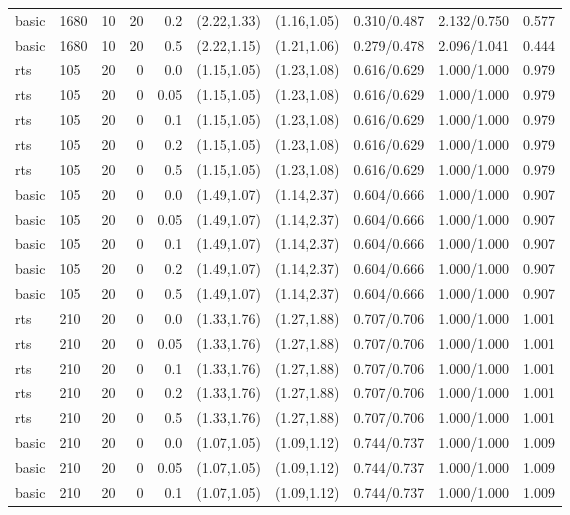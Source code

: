 \begin{tabular}{llrrrccccc}
basic & 1680 & 10 & 20 & 0.2 & (2.22,1.33) & (1.16,1.05) & 0.310/0.487 & 2.132/0.750 & 0.577 \\
basic & 1680 & 10 & 20 & 0.5 & (2.22,1.15) & (1.21,1.06) & 0.279/0.478 & 2.096/1.041 & 0.444 \\
rts & 105 & 20 & 0 & 0.0 & (1.15,1.05) & (1.23,1.08) & 0.616/0.629 & 1.000/1.000 & 0.979 \\
rts & 105 & 20 & 0 & 0.05 & (1.15,1.05) & (1.23,1.08) & 0.616/0.629 & 1.000/1.000 & 0.979 \\
rts & 105 & 20 & 0 & 0.1 & (1.15,1.05) & (1.23,1.08) & 0.616/0.629 & 1.000/1.000 & 0.979 \\
rts & 105 & 20 & 0 & 0.2 & (1.15,1.05) & (1.23,1.08) & 0.616/0.629 & 1.000/1.000 & 0.979 \\
rts & 105 & 20 & 0 & 0.5 & (1.15,1.05) & (1.23,1.08) & 0.616/0.629 & 1.000/1.000 & 0.979 \\
basic & 105 & 20 & 0 & 0.0 & (1.49,1.07) & (1.14,2.37) & 0.604/0.666 & 1.000/1.000 & 0.907 \\
basic & 105 & 20 & 0 & 0.05 & (1.49,1.07) & (1.14,2.37) & 0.604/0.666 & 1.000/1.000 & 0.907 \\
basic & 105 & 20 & 0 & 0.1 & (1.49,1.07) & (1.14,2.37) & 0.604/0.666 & 1.000/1.000 & 0.907 \\
basic & 105 & 20 & 0 & 0.2 & (1.49,1.07) & (1.14,2.37) & 0.604/0.666 & 1.000/1.000 & 0.907 \\
basic & 105 & 20 & 0 & 0.5 & (1.49,1.07) & (1.14,2.37) & 0.604/0.666 & 1.000/1.000 & 0.907 \\
rts & 210 & 20 & 0 & 0.0 & (1.33,1.76) & (1.27,1.88) & 0.707/0.706 & 1.000/1.000 & 1.001 \\
rts & 210 & 20 & 0 & 0.05 & (1.33,1.76) & (1.27,1.88) & 0.707/0.706 & 1.000/1.000 & 1.001 \\
rts & 210 & 20 & 0 & 0.1 & (1.33,1.76) & (1.27,1.88) & 0.707/0.706 & 1.000/1.000 & 1.001 \\
rts & 210 & 20 & 0 & 0.2 & (1.33,1.76) & (1.27,1.88) & 0.707/0.706 & 1.000/1.000 & 1.001 \\
rts & 210 & 20 & 0 & 0.5 & (1.33,1.76) & (1.27,1.88) & 0.707/0.706 & 1.000/1.000 & 1.001 \\
basic & 210 & 20 & 0 & 0.0 & (1.07,1.05) & (1.09,1.12) & 0.744/0.737 & 1.000/1.000 & 1.009 \\
basic & 210 & 20 & 0 & 0.05 & (1.07,1.05) & (1.09,1.12) & 0.744/0.737 & 1.000/1.000 & 1.009 \\
basic & 210 & 20 & 0 & 0.1 & (1.07,1.05) & (1.09,1.12) & 0.744/0.737 & 1.000/1.000 & 1.009 \\

\end{tabular}
